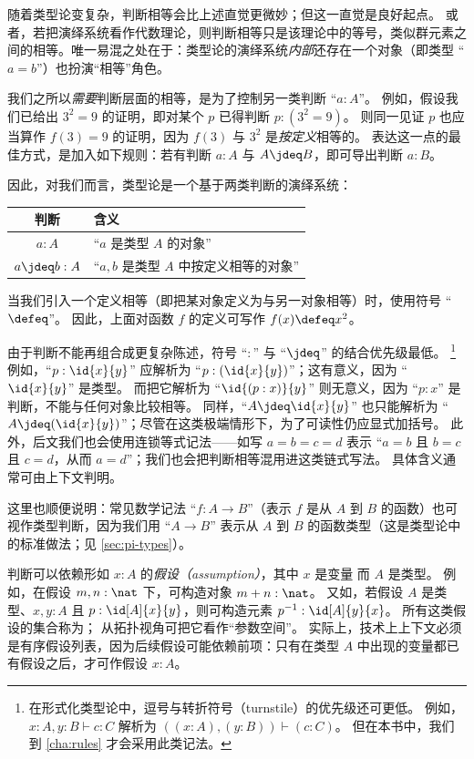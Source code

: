 随着类型论变复杂，判断相等会比上述直觉更微妙；但这一直觉是良好起点。
或者，若把演绎系统看作代数理论，则判断相等只是该理论中的等号，类似群元素之间的相等。唯一易混之处在于：类型论的演绎系统\emph{内部}还存在一个对象（即类型 ``$a=b$''）也扮演“相等”角色。

我们之所以\emph{需要}判断层面的相等，是为了控制另一类判断 “$a:A$”。
例如，假设我们已给出 $3^2=9$ 的证明，即对某个 $p$ 已得判断 $p:(3^2=9)$。
则同一见证 $p$ 也应当算作 $f(3)=9$ 的证明，因为 $f(3)$ 与 $3^2$ 是\emph{按定义}相等的。
表达这一点的最佳方式，是加入如下规则：若有判断 $a:A$ 与 $A\jdeq B$，即可导出判断 $a:B$。

因此，对我们而言，类型论是一个基于两类判断的演绎系统：
\begin{center}
\medskip
\begin{tabular}{cl}
  \toprule
  判断 & 含义\\
  \midrule
  $a : A$       & ``$a$ 是类型 $A$ 的对象''\\
  $a \jdeq b : A$ & ``$a,b$ 是类型 $A$ 中按定义相等的对象''\\
  \bottomrule
\end{tabular}
\medskip
\end{center}
%
%
当我们引入一个定义相等（即把某对象定义为与另一对象相等）时，使用符号 ``$\defeq$''。
因此，上面对函数 $f$ 的定义可写作 $f(x)\defeq x^2$。

由于判断不能再组合成更复杂陈述，符号 ``$:$'' 与 ``$\jdeq$'' 的结合优先级最低。%
\footnote{在形式化类型论中，逗号与转折符号（turnstile）的优先级还可更低。
  例如，$x:A,y:B\vdash c:C$ 解析为 $((x:A),(y:B))\vdash (c:C)$。
  但在本书中，我们到 \cref{cha:rules} 才会采用此类记法。}
例如，``$p:\id{x}{y}$'' 应解析为 ``$p:(\id{x}{y})$''；这有意义，因为 ``$\id{x}{y}$'' 是类型。
而把它解析为 ``$\id{(p:x)}{y}$'' 则无意义，因为 ``$p:x$'' 是判断，不能与任何对象比较相等。
同样，``$A\jdeq \id{x}{y}$'' 也只能解析为 ``$A\jdeq(\id{x}{y})$''；尽管在这类极端情形下，为了可读性仍应显式加括号。
此外，后文我们也会使用连锁等式记法——如写 $a=b=c=d$ 表示 “$a=b$ 且 $b=c$ 且 $c=d$，从而 $a=d$”；我们也会把判断相等混用进这类链式写法。
具体含义通常可由上下文判明。

这里也顺便说明：常见数学记法 ``$f:A\to B$''（表示 $f$ 是从 $A$ 到 $B$ 的函数）也可视作类型判断，因为我们用 ``$A\to B$'' 表示从 $A$ 到 $B$ 的函数类型（这是类型论中的标准做法；见 \cref{sec:pi-types}）。

%
判断可以依赖形如 $x:A$ 的\emph{假设（assumption）}，其中 $x$ 是变量
%
而 $A$ 是类型。
例如，在假设 $m,n:\nat$ 下，可构造对象 $m+n:\nat$。
又如，若假设 $A$ 是类型、$x,y:A$ 且 $p:\id[A]{x}{y}$，则可构造元素 $p^{-1}:\id[A]{y}{x}$。
所有这类假设的集合称为；%
从拓扑视角可把它看作“参数空间”。
实际上，技术上上下文必须是有序假设列表，因为后续假设可能依赖前项：只有在类型 $A$ 中出现的变量都已有假设之后，才可作假设 $x:A$。

